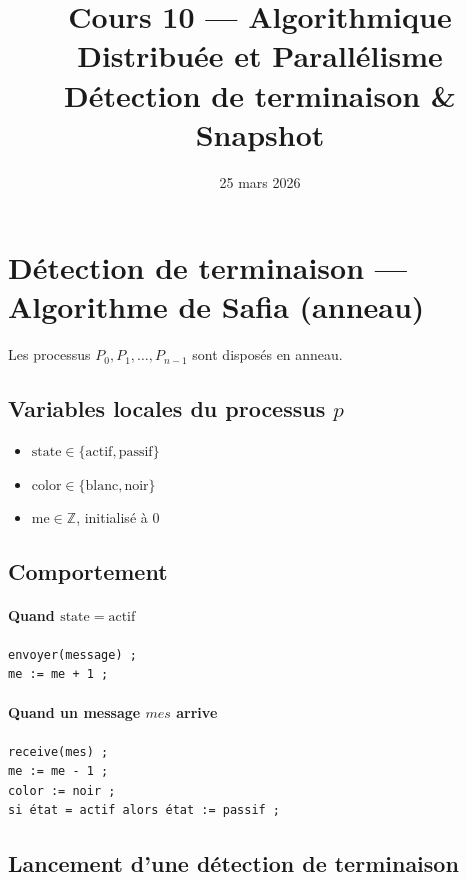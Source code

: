 \documentclass[12pt,a4paper]{article}
\title{\textbf{Cours 10 — Algorithmique Distribuée et Parallélisme}\\
\large Détection de terminaison \& Snapshot}
\date{25 mars 2026}
\author{}
\theoremstyle{definition}
\theoremstyle{plain}
\theoremstyle{remark}
\begin{document}
\maketitle
\tableofcontents
\newpage

\section{Détection de terminaison — Algorithme de Safia (anneau)}

Les processus $P_0, P_1, \ldots, P_{n-1}$ sont disposés en anneau.

\subsection{Variables locales du processus $p$}

\begin{itemize}
  \item $\mathrm{state} \in \{\text{actif}, \text{passif}\}$
  \item $\mathrm{color} \in \{\text{blanc}, \text{noir}\}$
  \item $\mathrm{me} \in \mathbb{Z}$, initialisé à $0$
\end{itemize}

\subsection{Comportement}

\paragraph{Quand $\mathrm{state} = \text{actif}$}
\begin{verbatim}
envoyer(message) ;
me := me + 1 ;
\end{verbatim}

\paragraph{Quand un message $\mathit{mes}$ arrive}
\begin{verbatim}
receive(mes) ;
me := me - 1 ;
color := noir ;
si état = actif alors état := passif ;
\end{verbatim}

\subsection{Lancement d'une détection de terminaison}
\end{document}
